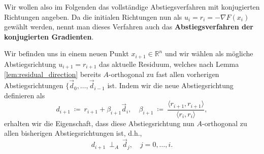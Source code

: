 Wir wollen also im Folgenden das vollständige Abstiegsverfahren mit konjugierten Richtungen angeben. Da die initialen Richtungen nun als $u_i = r_i = -\nabla F(x_i)$ gewählt werden, nennt man dieses Verfahren auch das \textbf{Abstiegsverfahren der konjugierten Gradienten}.
\begin{theorem}{}{}
Wir befinden uns in einem neuen Punkt $x_{i+1} \in \mathbb{R}^n$ und wir wählen als mögliche Abstiegsrichtung $u_{i+1} = r_{i+1}$ das aktuelle Residuum, welches nach Lemma \ref{lem:residual_direction} bereits $A$-orthogonal zu fast allen vorherigen Abstiegsrichtungen $\lbrace \vec{d}_0, \ldots, \vec{d}_{i-1}$ ist.
Indem wir die neue Abstiegsrichtung definieren als
\begin{equation}
\label{eq:conjugated_gradient}
d_{i+1} \ \coloneqq \ r_{i+1} + \beta_{i+1} \vec{d}_i, \quad \beta_{i+1} \ \coloneqq \ \frac{\langle r_{i+1}, r_{i+1} \rangle}{\langle r_i, r_i \rangle},
\end{equation} 
erhalten wir die Eigenschaft, dass diese Abstiegsrichtung nun $A$-orthogonal zu allen bisherigen Abstiegsrichtungen ist, d.h.,
\begin{equation*}
d_{i+1} \ \perp_A \ \vec{d}_j, \quad j = 0,\ldots,i.
\end{equation*}
\end{theorem}
